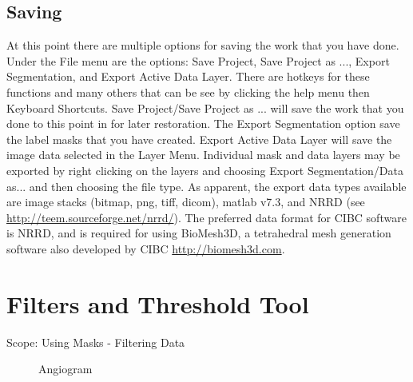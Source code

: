 \documentclass[fleqn,11pt,openany]{book}
\begin{document}
\section{Saving}

At this point there are multiple options for saving the work that you have done.  Under the File menu are the options: Save Project, Save Project as ..., Export Segmentation, and Export Active Data Layer.  There are hotkeys for these functions and many others that can be see by clicking the help menu then Keyboard Shortcuts.  Save Project/Save Project as ... will save the work that you done to this point in for later restoration.  The Export Segmentation option save the label masks that you have created.   Export Active Data Layer will save the image data selected in the Layer Menu.  Individual mask and data layers may be exported by right clicking on the layers and choosing Export Segmentation/Data as... and then choosing the file type.  As apparent, the export data types available are image stacks (bitmap, png, tiff, dicom), matlab v7.3, and NRRD (see \url{http://teem.sourceforge.net/nrrd/}).  The preferred data format for CIBC software is NRRD, and is required for using BioMesh3D, a tetrahedral mesh generation software also developed by CIBC \url{http://biomesh3d.com}.
  
\chapter{Filters and Threshold Tool}

\begin{introduction}
Scope: Using Masks - Filtering Data
\end{introduction}

\begin{figure}
\caption{Angiogram}\label{fig:AngioData}
\end{figure}
\end{document}
